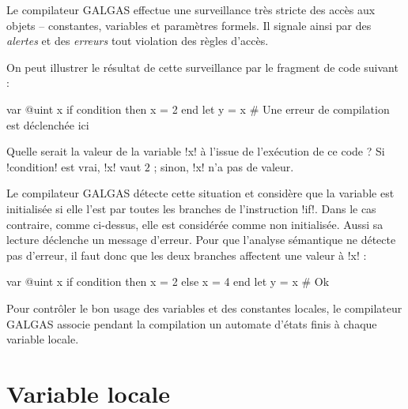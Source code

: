 
\newcommand\FlecheEtatInitial[2]{
  \node[#2 of #1,draw=black,circle,thick,fill=\FondAutomate] (Z) {};
  \draw[-stealth,thick,black] (Z) -- (#1);
}


Le compilateur GALGAS effectue une surveillance très stricte des accès aux objets -- constantes, variables et paramètres formels. Il signale ainsi par des \emph{alertes} et des \emph{erreurs} tout violation des règles d'accès.

On peut illustrer le résultat de cette surveillance par le fragment de code suivant :
\begin{galgas}
var @uint x
if condition then
  x = 2
end
let y = x # Une erreur de compilation est déclenchée ici
\end{galgas}

Quelle serait la valeur de la variable \ggs!x! à l'issue de l'exécution de ce code ? Si \ggs!condition! est vrai, \ggs!x! vaut $2$ ; sinon, \ggs!x! n'a pas de valeur.

Le compilateur GALGAS détecte cette situation et considère que la variable est initialisée si elle l'est par toutes les branches de l'instruction \ggs!if!. Dans le cas contraire, comme ci-dessus, elle est considérée comme non initialisée. Aussi sa lecture déclenche un message d'erreur. Pour que l'analyse sémantique ne détecte pas d'erreur, il faut donc que les deux branches affectent une valeur à \ggs!x! :

\begin{galgas}
var @uint x
if condition then
  x = 2
else
  x = 4
end
let y = x # Ok
\end{galgas}

Pour contrôler le bon usage des variables et des constantes locales, le compilateur GALGAS associe pendant la compilation un automate d'états finis à chaque variable locale. 














\section{Variable locale}

